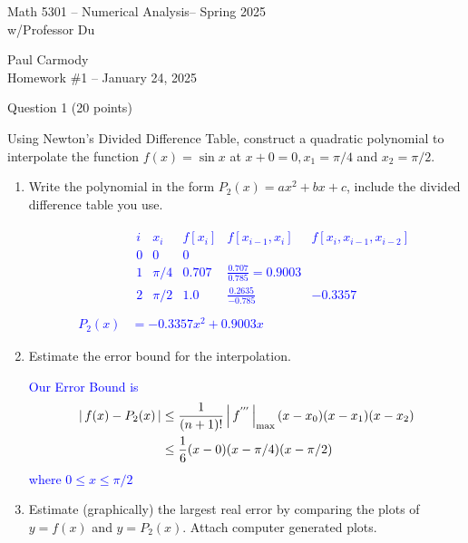 \documentclass[10pt,a4paper]{report}
\newcommand{\CLASSNAME}{Math 5301 -- Numerical Analysis}
\newcommand{\STUDENTNAME}{Paul Carmody}
\newcommand{\ASSIGNMENT}{Homework \#1 }
\newcommand{\DUEDATE}{January 24, 2025}
\newcommand{\SEMESTER}{Spring 2025}
\newcommand{\BLUE}[1]{\textcolor{blue}{#1}}
\begin{document}
\begin{center}
	\Large{\CLASSNAME -- \SEMESTER} \\
	\large{ w/Professor Du}
\end{center}
\begin{center}
	\STUDENTNAME \\
	\ASSIGNMENT -- \DUEDATE\\
\end{center} 

Question 1 (20 points)
\vspace{1 em}

Using Newton's Divided Difference Table, construct a quadratic polynomial to interpolate the function $f(x) = \sin x$ at $x+0=0, x_1=\pi/4$ and $x_2=\pi/2$.
\begin{enumerate}[label=(\alph*)]

	\item Write the polynomial in the form $P_2(x)=ax^2+bx+c$, include the divided difference table you use.
	
	\BLUE{\begin{align*}
			&\begin{array}{ccccc}
				\hline 
				i & x_i & f[x_i] & f[x_{i-1},x_i] & f[x_i, x_{i-1},x_{i-2}]\\
				\hline
				0 & 0 & 0 \\
				1 & \pi/4 & 0.707 &\frac{0.707}{0.785} = 0.9003\\
				2 & \pi/2 & 1.0 &\frac{0.2635}{-0.785}& -0.3357
			\end{array}\\ \\
			P_2(x) &= -0.3357x^2+0.9003x
		\end{align*}	
	}
	\item Estimate the error bound for the interpolation.
	
	\BLUE{Our Error Bound is
	\begin{align*}
		\left |\, f(x) - P_2(x) \,\right | &\le \frac{1}{(n+1)!}\left |\, f^{'''} \,\right |_{\max}(x-x_0)(x-x_1)(x-x_2) \\
		&\le \frac{1}{6}(x-0)(x-\pi/4)(x-\pi/2) 
	\end{align*}where $0\le x \le \pi/2$
	}
	\item Estimate (graphically) the largest real error by comparing the plots of $y=f(x)$ and $y=P_2(x)$.  Attach computer generated plots.
	

\end{enumerate}
\end{document}
